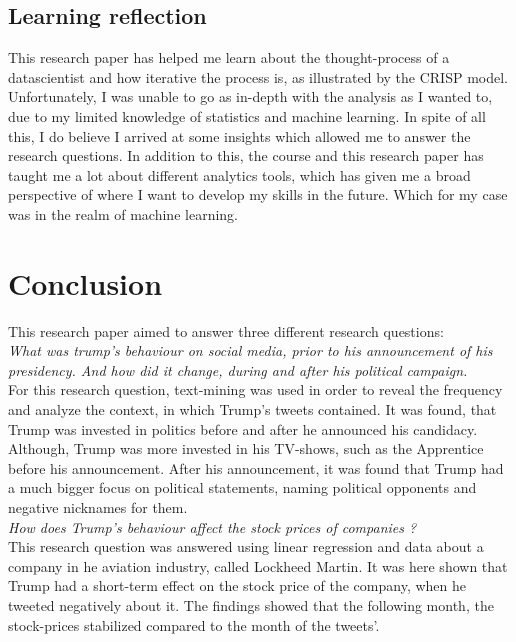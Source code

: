 \documentclass[11pt]{article}
\begin{document}
\subsection{Learning reflection}
This research paper has helped me learn about the thought-process of a datascientist and how iterative the process is, as illustrated by the CRISP model. Unfortunately, I was unable to go as in-depth with the analysis as I wanted to, due to my limited knowledge of statistics and machine learning. In spite of all this, I do believe I arrived at some insights which allowed me to answer the research questions. In addition to this, the course and this research paper has taught me a lot about different analytics tools, which has given me a broad perspective of where I want to develop my skills in the future. Which for my case was in the realm of machine learning.


\section{Conclusion}
This research paper aimed to answer three different research questions: \\

\textit{What was trump's behaviour on social media, prior to his announcement of his presidency. And how did it change, during and after his political campaign.}\\

For this research question, text-mining was used in order to reveal the frequency and analyze the context, in which Trump's tweets contained. It was found, that Trump was invested in politics before and after he announced his candidacy. Although, Trump was more invested in his TV-shows, such as the Apprentice before his announcement. After his announcement, it was found that Trump had a much bigger focus on political statements, naming political opponents and negative nicknames for them. \\

\textit{How does Trump's behaviour affect the stock prices of companies ?} \\

This research question was answered using linear regression and data about a company in he aviation industry, called Lockheed Martin. It was here shown that Trump had a short-term effect on the stock price of the company, when he tweeted negatively about it. The findings showed that the following month, the stock-prices stabilized compared to the month of the tweets'.\\
\end{document}
